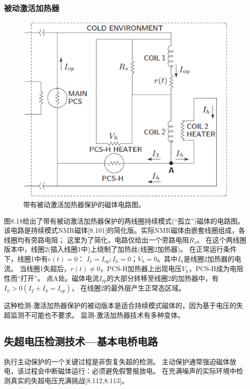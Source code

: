 \subsubsection*{被动激活加热器}
\begin{figure}
	\centering
	\includegraphics[scale=0.6]{chpt8/figs/fig8.18.eps}
	\caption{带有被动激活加热器保护的磁体电路图。}
\end{figure}

图8.18给出了带有被动激活加热器保护的两线圈持续模式(“孤立”)磁体的电路图。
该电路是持续模式NMR磁体[8.101]的简化版。实际NMR磁体由嵌套线圈组成，各线圈均有旁路电阻；
这里为了简化，电路仅给出一个旁路电阻$R_s$。
在这个两线圈版本中，线圈2(插入线圈1中)上绕制了加热丝(线圈2加热器)。
在正常运行条件下，线圈1中有$r(t)=0$：
$I_1=I_{op};I_h=0；V_h=0$。其中$I_h$是线圈2加热器的电流。
当线圈1失超后，$r(t)\neq 0$，PCS-H加热器上出现电压$V_h$，PCS-H成为电阻性而“打开”。
点A处。磁体电流$I_{op}$的大部分转移至线圈2的加热器中，有$I_h>0(I_2+I_h=I_{op})$，
在线圈2的最外层产生正常态区域。

这种检测-激活加热器保护的被动版本是适合持续模式磁体的，因为基于电压的失超监测不可能也不要求。
监测-激活加热器技术有多种变体。



\subsection{失超电压检测技术---基本电桥电路}
执行主动保护的一个关键过程是非恢复失超的检测。
主动保护通常强迫磁体放电，该过程会中断磁体运行：必须避免假警报放电。
在充满噪声的实际环境中检测真实的失超电压充满挑战[8.112,8.113]。

